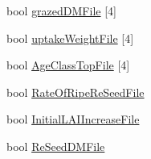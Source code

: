 \begin{DoxyCompactItemize}
bool \hyperlink{classcrop_parameters_ryegrass_a787b6af72b64d032afd014be5cdb9654}{grazedDMFile} \mbox{[}4\mbox{]}
\item 
bool \hyperlink{classcrop_parameters_ryegrass_afccc3676a53ab5fc31fcb8bfd8e9468e}{uptakeWeightFile} \mbox{[}4\mbox{]}
\item 
bool \hyperlink{classcrop_parameters_ryegrass_a24e6036dfa579c86a93828ffdd2bbff6}{AgeClassTopFile} \mbox{[}4\mbox{]}
\item 
bool \hyperlink{classcrop_parameters_ryegrass_a69a8b5f03918aa4ce93de7122d9d4f7c}{RateOfRipeReSeedFile}
\item 
bool \hyperlink{classcrop_parameters_ryegrass_a60b7f00a614094b61ef60360779b3f7d}{InitialLAIIncreaseFile}
\item 
bool \hyperlink{classcrop_parameters_ryegrass_aa888a2fce3792901d638d8e55caade19}{ReSeedDMFile}
\end{DoxyCompactItemize}


